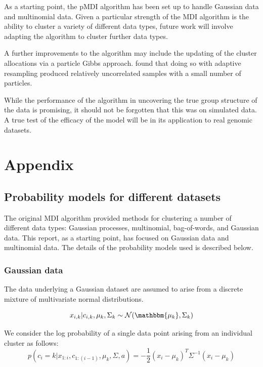 \documentclass[10pt,a4paper]{article}
\begin{document}
As a starting point, the pMDI algorithm has been set up to handle Gaussian data and multinomial data. Given a particular strength of the MDI algorithm is the ability to cluster a variety of different data types, future work will involve adapting the algorithm to cluster further data types.

A further improvements to the algorithm may include the updating of the cluster allocations via a particle Gibbs approach.  found that doing so with adaptive resampling produced relatively uncorrelated samples with a small number of particles.


While the performance of the algorithm in uncovering the true group structure of the data is promising, it should not be forgotten that this was on simulated data. A true test of the efficacy of the model will be in its application to real genomic datasets. 




\section*{Appendix}
\subsection*{Probability models for different datasets}
The original MDI algorithm provided methods for clustering a number of different data types: Gaussian processes, multinomial, bag-of-words, and Gaussian data. This report, as a starting point, has focused on Gaussian data and multinomial data. The details of the probability models used is described below.
\subsubsection*{Gaussian data}
The data underlying a Gaussian dataset are assumed to arise from a discrete mixture of multivariate normal distributions.

\begin{equation}
x_{i, k}|c_{i,k},\mu_k, \Sigma_k \sim \mathcal{N}(\mathbbm{\mu_k}, \Sigma_k)
\end{equation}

We consider the log probability of a single data point arising from an individual cluster as follows:
\begin{equation}
p(c_{i} = k| x_{1:i}, c_{1:(i - 1)},\mu_k, \Sigma, a) = 
 -\frac{1}{2}(x_i - \mu_k)^T \Sigma^{-1} (x_i - \mu_k)
\end{equation}
\end{document}
